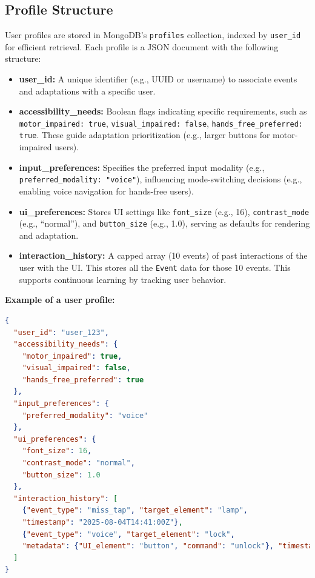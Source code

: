 \documentclass[openany]{book}
\begin{document}
\subsection{Profile Structure}
User profiles are stored in MongoDB’s \texttt{profiles} collection, indexed by \texttt{user\_id} for efficient retrieval. Each profile is a JSON document with the following structure:
\begin{itemize}
    \item \textbf{user\_id:} A unique identifier (e.g., UUID or username) to associate events and adaptations with a specific user.
    \item \textbf{accessibility\_needs:} Boolean flags indicating specific requirements, such as \texttt{motor\_impaired: true}, \texttt{visual\_impaired: false}, \texttt{hands\_free\_preferred: true}. These guide adaptation prioritization (e.g., larger buttons for motor-impaired users).
    \item \textbf{input\_preferences:} Specifies the preferred input modality (e.g., \texttt{preferred\_modality: "voice"}), influencing mode-switching decisions (e.g., enabling voice navigation for hands-free users).
    \item \textbf{ui\_preferences:} Stores UI settings like \texttt{font\_size} (e.g., 16), \texttt{contrast\_mode} (e.g., ``normal''), and \texttt{button\_size} (e.g., 1.0), serving as defaults for rendering and adaptation.
    \item \textbf{interaction\_history:} A capped array (10 events) of past interactions of the user with the UI. This stores all the \texttt{Event} data for those 10 events.
    This supports continuous learning by tracking user behavior.
\end{itemize}
\textbf{Example of a user profile:}
\begin{lstlisting}[language=json,firstnumber=1]
{
  "user_id": "user_123",
  "accessibility_needs": {
    "motor_impaired": true,
    "visual_impaired": false,
    "hands_free_preferred": true
  },
  "input_preferences": {
    "preferred_modality": "voice"
  },
  "ui_preferences": {
    "font_size": 16,
    "contrast_mode": "normal",
    "button_size": 1.0
  },
  "interaction_history": [
    {"event_type": "miss_tap", "target_element": "lamp",
    "timestamp": "2025-08-04T14:41:00Z"},
    {"event_type": "voice", "target_element": "lock",
    "metadata": {"UI_element": "button", "command": "unlock"}, "timestamp": "2025-08-04T14:42:00Z"}
  ]
}
\end{lstlisting}
\end{document}
